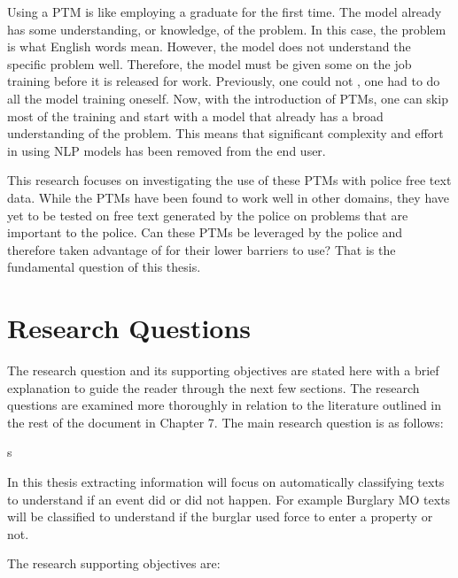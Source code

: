 Using a PTM is like employing a graduate for the first time. The model already has some understanding, or knowledge, of the problem. In this case, the problem is what English words mean. However, the model does not understand the specific problem well. Therefore, the model must be given some on the job training before it is released for work. Previously, one could not , one had to do all the model training oneself. Now, with the introduction of PTMs, one can skip most of the training and start with a model that already has a broad understanding of the problem. This means that significant complexity and effort in using NLP models has been removed from the end user.

This research focuses on investigating the use of these PTMs with police free text data. While the PTMs have been found to work well in other domains, they have yet to be tested on free text generated by the police on problems that are important to the police. Can these PTMs be leveraged by the police and therefore taken advantage of for their lower barriers to use? That is the fundamental question of this thesis.


\section{Research Questions}

The research question and its supporting objectives are stated here with a brief explanation to guide the reader through the next few sections. The research questions are examined more thoroughly in relation to the literature outlined in the rest of the document in Chapter 7. The main research question is as follows:

s

In this thesis extracting information will focus on automatically classifying texts to understand if an event did or did not happen. For example Burglary MO texts will be classified to understand if the burglar used force to enter a property or not.

The research supporting objectives are:


